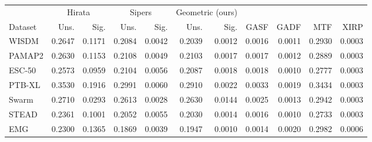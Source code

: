 \begin{tabular}{@{}lrrrrrrrrrr@{}}
\toprule
& \multicolumn{2}{c}{Hirata} & \multicolumn{2}{c}{Sipers} & \multicolumn{2}{c}{Geometric (ours)} & & & & \\
\cmidrule(lr){2-3}\cmidrule(lr){4-5}\cmidrule(lr){6-7}
Dataset & Uns. & Sig. & Uns. & Sig. & Uns. & Sig. & GASF & GADF & MTF & XIRP \\
\midrule
WISDM & 0.2647 & 0.1171 & 0.2084 & 0.0042 & 0.2039 & 0.0012 & 0.0016 & 0.0011 & 0.2930 & 0.0003 \\
PAMAP2 & 0.2630 & 0.1153 & 0.2108 & 0.0049 & 0.2103 & 0.0017 & 0.0017 & 0.0012 & 0.2889 & 0.0003 \\
ESC-50 & 0.2573 & 0.0959 & 0.2104 & 0.0056 & 0.2087 & 0.0018 & 0.0018 & 0.0010 & 0.2777 & 0.0003 \\
PTB-XL & 0.3530 & 0.1916 & 0.2991 & 0.0060 & 0.2910 & 0.0022 & 0.0033 & 0.0019 & 0.3434 & 0.0003 \\
Swarm & 0.2710 & 0.0293 & 0.2613 & 0.0028 & 0.2630 & 0.0144 & 0.0025 & 0.0013 & 0.2942 & 0.0003 \\
STEAD & 0.2361 & 0.1001 & 0.2052 & 0.0055 & 0.2030 & 0.0014 & 0.0016 & 0.0010 & 0.2733 & 0.0003 \\
EMG & 0.2300 & 0.1365 & 0.1869 & 0.0039 & 0.1947 & 0.0010 & 0.0014 & 0.0020 & 0.2982 & 0.0006 \\
\bottomrule
\end{tabular}
